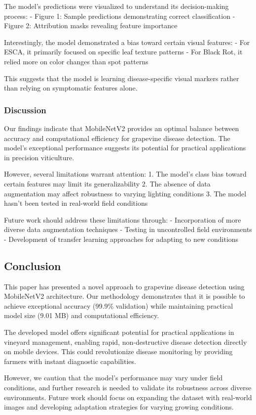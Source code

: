 \documentclass[
]{article}
\begin{document}
The model's predictions were visualized to understand its
decision-making process: - Figure 1: Sample predictions demonstrating
correct classification - Figure 2: Attribution masks revealing feature
importance

Interestingly, the model demonstrated a bias toward certain visual
features: - For ESCA, it primarily focused on specific leaf texture
patterns - For Black Rot, it relied more on color changes than spot
patterns

This suggests that the model is learning disease-specific visual markers
rather than relying on symptomatic features alone.

\subsubsection{Discussion}\label{discussion}

Our findings indicate that MobileNetV2 provides an optimal balance
between accuracy and computational efficiency for grapevine disease
detection. The model's exceptional performance suggests its potential
for practical applications in precision viticulture.

However, several limitations warrant attention: 1. The model's class
bias toward certain features may limit its generalizability 2. The
absence of data augmentation may affect robustness to varying lighting
conditions 3. The model hasn't been tested in real-world field
conditions

Future work should address these limitations through: - Incorporation of
more diverse data augmentation techniques - Testing in uncontrolled
field environments - Development of transfer learning approaches for
adapting to new conditions

\subsection{Conclusion}\label{conclusion}

This paper has presented a novel approach to grapevine disease detection
using MobileNetV2 architecture. Our methodology demonstrates that it is
possible to achieve exceptional accuracy (99.9\% validation) while
maintaining practical model size (9.01 MB) and computational efficiency.

The developed model offers significant potential for practical
applications in vineyard management, enabling rapid, non-destructive
disease detection directly on mobile devices. This could revolutionize
disease monitoring by providing farmers with instant diagnostic
capabilities.

However, we caution that the model's performance may vary under field
conditions, and further research is needed to validate its robustness
across diverse environments. Future work should focus on expanding the
dataset with real-world images and developing adaptation strategies for
varying growing conditions.
\end{document}
